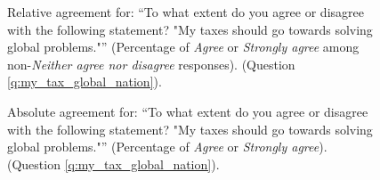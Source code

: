 \begin{figure}[h!]
    \caption[Relative agreement that ``My taxes should go towards solving global problems'']{Relative agreement for: ``To what extent do you agree or disagree with the following statement? "My taxes should go towards solving global problems."'' (Percentage of \textit{Agree} or \textit{Strongly agree} among non-\textit{Neither agree nor disagree} responses). (Question \ref{q:my_tax_global_nation}).
    }\label{fig:my_tax_global_nation_share}
\end{figure}

\begin{figure}[h!]
    \caption[Absolute agreement that ``My taxes should go towards solving global problems'']{Absolute agreement for: ``To what extent do you agree or disagree with the following statement? "My taxes should go towards solving global problems."'' (Percentage of \textit{Agree} or \textit{Strongly agree}). (Question \ref{q:my_tax_global_nation}).
    }\label{fig:my_tax_global_nation_positive}
\end{figure}

